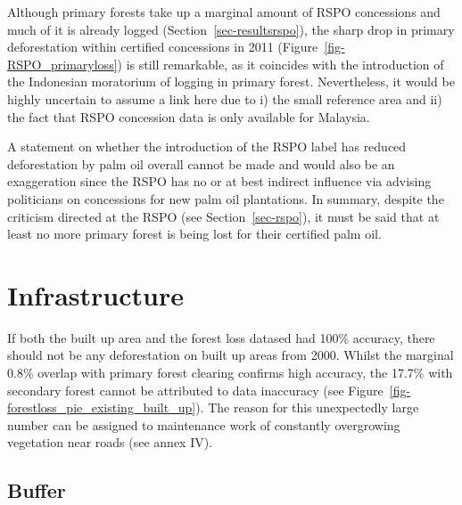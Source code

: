 \documentclass[
  letterpaper,
  DIV=11,
  numbers=noendperiod]{scrreprt}
\begin{document}
Although primary forests take up a marginal amount of RSPO concessions
and much of it is already logged (Section~\ref{sec-resultsrspo}), the
sharp drop in primary deforestation within certified concessions in 2011
(Figure~\ref{fig-RSPO_primaryloss}) is still remarkable, as it coincides
with the introduction of the Indonesian moratorium of logging in primary
forest. Nevertheless, it would be highly uncertain to assume a link here
due to i) the small reference area and ii) the fact that RSPO concession
data is only available for Malaysia.

A statement on whether the introduction of the RSPO label has reduced
deforestation by palm oil overall cannot be made and would also be an
exaggeration since the RSPO has no or at best indirect influence via
advising politicians on concessions for new palm oil plantations. In
summary, despite the criticism directed at the RSPO (see
Section~\ref{sec-rspo}), it must be said that at least no more primary
forest is being lost for their certified palm oil.

\hypertarget{infrastructure-2}{%
\section{Infrastructure}\label{infrastructure-2}}

If both the built up area and the forest loss datased had 100\%
accuracy, there should not be any deforestation on built up areas from
2000. Whilst the marginal 0.8\% overlap with primary forest clearing
confirms high accuracy, the 17.7\% with secondary forest cannot be
attributed to data inaccuracy (see
Figure~\ref{fig-forestloss_pie_existing_built_up}). The reason for this
unexpectedly large number can be assigned to maintenance work of
constantly overgrowing vegetation near roads (see annex IV).

\hypertarget{buffer}{%
\subsection{Buffer}\label{buffer}}
\end{document}
